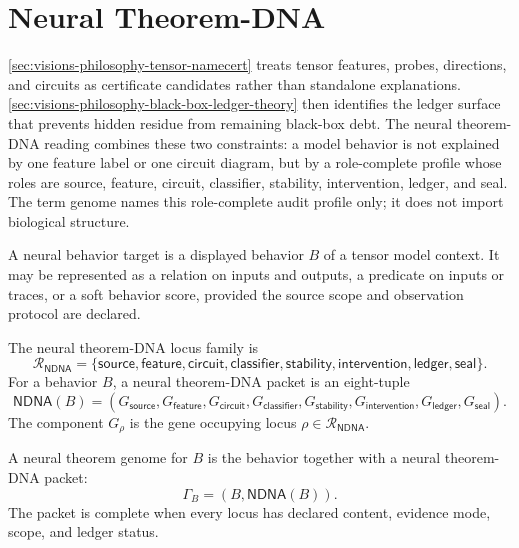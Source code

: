 \section{Neural Theorem-DNA}
\label{sec:visions-philosophy-neural-theorem-dna}

\autoref{sec:visions-philosophy-tensor-namecert} treats tensor features,
probes, directions, and circuits as certificate candidates rather than
standalone explanations. \autoref{sec:visions-philosophy-black-box-ledger-theory}
then identifies the ledger surface that prevents hidden residue from
remaining black-box debt. The neural theorem-DNA reading combines these
two constraints: a model behavior is not explained by one feature label
or one circuit diagram, but by a role-complete profile whose roles are
source, feature, circuit, classifier, stability, intervention, ledger,
and seal. The term genome names this role-complete audit profile only;
it does not import biological structure.

\begin{definition}
\label{def:philosophy-neural-behavior-target}
A neural behavior target is a displayed behavior $B$ of a tensor model
context. It may be represented as a relation on inputs and outputs, a
predicate on inputs or traces, or a soft behavior score, provided the
source scope and observation protocol are declared.
\end{definition}

\begin{definition}
\label{def:philosophy-neural-theorem-dna-loci}
The neural theorem-DNA locus family is
$$
\mathcal R_{\mathsf{NDNA}}
=
\{
\mathsf{source},
\mathsf{feature},
\mathsf{circuit},
\mathsf{classifier},
\mathsf{stability},
\mathsf{intervention},
\mathsf{ledger},
\mathsf{seal}
\}.
$$
For a behavior $B$, a neural theorem-DNA packet is an eight-tuple
$$
\mathsf{NDNA}(B)
=
(
G_{\mathsf{source}},
G_{\mathsf{feature}},
G_{\mathsf{circuit}},
G_{\mathsf{classifier}},
G_{\mathsf{stability}},
G_{\mathsf{intervention}},
G_{\mathsf{ledger}},
G_{\mathsf{seal}}
).
$$
The component $G_{\rho}$ is the gene occupying locus
$\rho\in\mathcal R_{\mathsf{NDNA}}$.
\end{definition}

\begin{definition}
\label{def:philosophy-neural-theorem-genome}
A neural theorem genome for $B$ is the behavior together with a neural
theorem-DNA packet:
$$
\Gamma_B=(B,\mathsf{NDNA}(B)).
$$
The packet is complete when every locus has declared content, evidence
mode, scope, and ledger status.
\end{definition}

